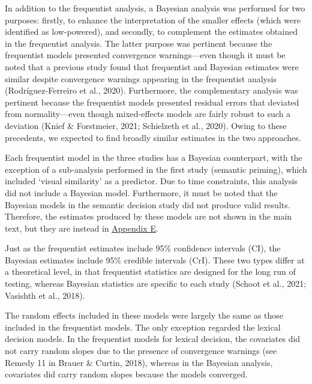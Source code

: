 \documentclass[
  12pt,
  man,floatsintext]{apa7}
\begin{document}
In addition to the frequentist analysis, a Bayesian analysis was performed for two purposes: firstly, to enhance the interpretation of the smaller effects (which were identified as low-powered), and secondly, to complement the estimates obtained in the frequentist analysis. The latter purpose was pertinent because the frequentist models presented convergence warnings---even though it must be noted that a previous study found that frequentist and Bayesian estimates were similar despite convergence warnings appearing in the frequentist analysis (Rodríguez-Ferreiro et al., 2020). Furthermore, the complementary analysis was pertinent because the frequentist models presented residual errors that deviated from normality---even though mixed-effects models are fairly robust to such a deviation (Knief \& Forstmeier, 2021; Schielzeth et al., 2020). Owing to these precedents, we expected to find broadly similar estimates in the two approaches.

Each frequentist model in the three studies has a Bayesian counterpart, with the exception of a sub-analysis performed in the first study (semantic priming), which included `visual similarity' as a predictor. Due to time constraints, this analysis did not include a Bayesian model. Furthermore, it must be noted that the Bayesian models in the semantic decision study did not produce valid results. Therefore, the estimates produced by these models are not shown in the main text, but they are instead in \protect\hyperlink{appendix-E-Bayesian-analysis-results}{\underline{Appendix E}}.

Just as the frequentist estimates include 95\% confidence intervals (CI), the Bayesian estimates include 95\% credible intervals (CrI). These two types differ at a theoretical level, in that frequentist statistics are designed for the long run of testing, whereas Bayesian statistics are specific to each study (Schoot et al., 2021; Vasishth et al., 2018).

The random effects included in these models were largely the same as those included in the frequentist models. The only exception regarded the lexical decision models. In the frequentist models for lexical decision, the covariates did not carry random slopes due to the presence of convergence warnings (see Remedy 11 in Brauer \& Curtin, 2018), whereas in the Bayesian analysis, covariates did carry random slopes because the models converged.
\end{document}
